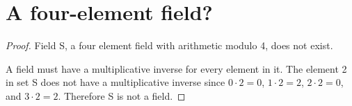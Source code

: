\section{A four-element field?}
\begin{proof} Field S, a four element field with arithmetic modulo 4, does not exist.

    A field must have a multiplicative inverse for every element in it.
    The element 2 in set S does not have a multiplicative inverse since
    $0 \cdot 2 = 0$,
    $1 \cdot 2 = 2$,
    $2 \cdot 2 = 0$, and
    $3 \cdot 2 = 2$.
    Therefore S is not a field.
\end{proof}